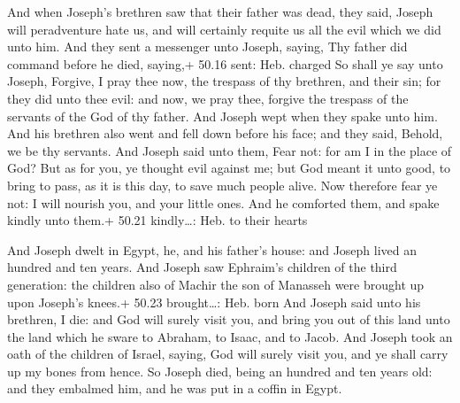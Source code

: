  And when Joseph's brethren saw that their father was
dead, they said, Joseph will peradventure hate us, and will certainly
requite us all the evil which we did unto him.  And they
sent a messenger unto Joseph, saying, Thy father did command before he
died, saying,+ 50.16 sent: Heb. charged  So shall ye say
unto Joseph, Forgive, I pray thee now, the trespass of thy brethren, and
their sin; for they did unto thee evil: and now, we pray thee, forgive
the trespass of the servants of the God of thy father. And Joseph wept
when they spake unto him.  And his brethren also went and
fell down before his face; and they said, Behold, we be thy servants.
 And Joseph said unto them, Fear not: for am I in the place
of God?  But as for you, ye thought evil against me; but
God meant it unto good, to bring to pass, as it is this day, to save
much people alive.  Now therefore fear ye not: I will
nourish you, and your little ones. And he comforted them, and spake
kindly unto them.+ 50.21 kindly\ldots: Heb. to their hearts

 And Joseph dwelt in Egypt, he, and his father's house:
and Joseph lived an hundred and ten years.  And Joseph saw
Ephraim's children of the third generation: the children also of Machir
the son of Manasseh were brought up upon Joseph's knees.+ 50.23
brought\ldots: Heb. born  And Joseph said unto his
brethren, I die: and God will surely visit you, and bring you out of
this land unto the land which he sware to Abraham, to Isaac, and to
Jacob.  And Joseph took an oath of the children of Israel,
saying, God will surely visit you, and ye shall carry up my bones from
hence.  So Joseph died, being an hundred and ten years old:
and they embalmed him, and he was put in a coffin in Egypt.
